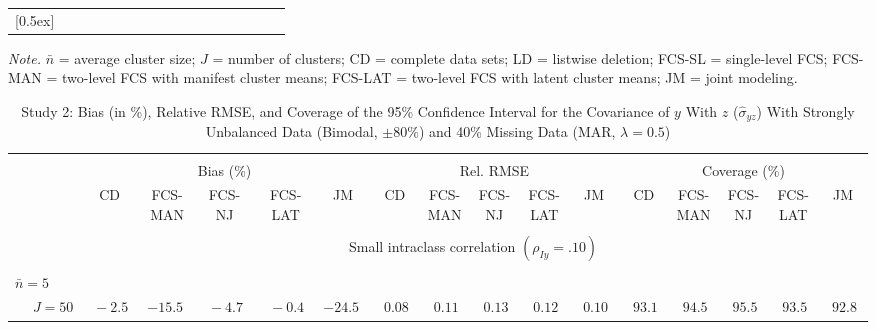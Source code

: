 \begin{sidewaystable}
\begin{threeparttable}
\begin{tabular}{llccccccccccccccc}
[0.5ex]\hline\\[-1.6ex] 
\end{tabular}
\begin{tablenotes}{\footnotesize \textit{Note.} $\bar{n}$ = average cluster size; $J$ = number of clusters; CD = complete data sets; LD = listwise deletion; FCS-SL = single-level FCS; FCS-MAN = two-level FCS with manifest cluster means; FCS-LAT = two-level FCS with latent cluster means; JM = joint modeling.}\end{tablenotes}
\end{threeparttable}
\end{sidewaystable}
\begin{sidewaystable}
\begin{threeparttable}
\setlength{\tabcolsep}{1.0pt}
\renewcommand{\arraystretch}{0.95}
\footnotesize
\caption{\small Study 2: Bias (in \%), Relative RMSE, and Coverage of the 95\% Confidence Interval for the Covariance of $y$ With $z$ ($\hat\sigma_{yz}$) With Strongly Unbalanced Data (Bimodal, $\pm 80\%$) and 40\% Missing Data (MAR, $\lambda=0.5$)}
\begin{tabular}{llccccccccccccccc}
\hline\\[-1.8ex]
& & \multicolumn{5}{c}{Bias (\%)} & \multicolumn{5}{c}{Rel. RMSE} & \multicolumn{5}{c}{Coverage (\%)} \\ \cmidrule(r){3-7}\cmidrule(r){8-12}\cmidrule(r){13-17}
 &  & CD & \makecell{FCS-\\MAN} & \makecell{FCS-\\NJ} & \makecell{FCS-\\LAT} & JM & CD & \makecell{FCS-\\MAN} & \makecell{FCS-\\NJ} & \makecell{FCS-\\LAT} & JM & CD & \makecell{FCS-\\MAN} & \makecell{FCS-\\NJ} & \makecell{FCS-\\LAT} & \multicolumn{1}{c}{JM} \\ 
[0.4ex]\hline\\[-1.8ex]
& & \multicolumn{15}{c}{Small intraclass correlation $(\rho_{Iy}=.10)$} \\[0.6ex]\hline\\[-1.8ex]
\multicolumn{4}{l}{$\bar{n}=5$} \\  & \nopagebreak $\;J=50$  & $\phantom{0}{-}2.5\phantom{0}$ & ${-}15.5\phantom{0}$ & $\phantom{0}{-}4.7\phantom{0}$ & $\phantom{0}{-}0.4\phantom{0}$ & ${-}24.5\phantom{0}$ & $\phantom{0}0.08\phantom{0}$ & $\phantom{0}0.11\phantom{0}$ & $\phantom{0}0.13\phantom{0}$ & $\phantom{0}0.12\phantom{0}$ & $\phantom{0}0.10\phantom{0}$ & $\phantom{0}93.1\phantom{0}$ & $\phantom{0}94.5\phantom{0}$ & $\phantom{0}95.5\phantom{0}$ & $\phantom{0}93.5\phantom{0}$ & $\phantom{0}92.8\phantom{0}$ \\

\end{tabular}
\end{threeparttable}
\end{sidewaystable}
